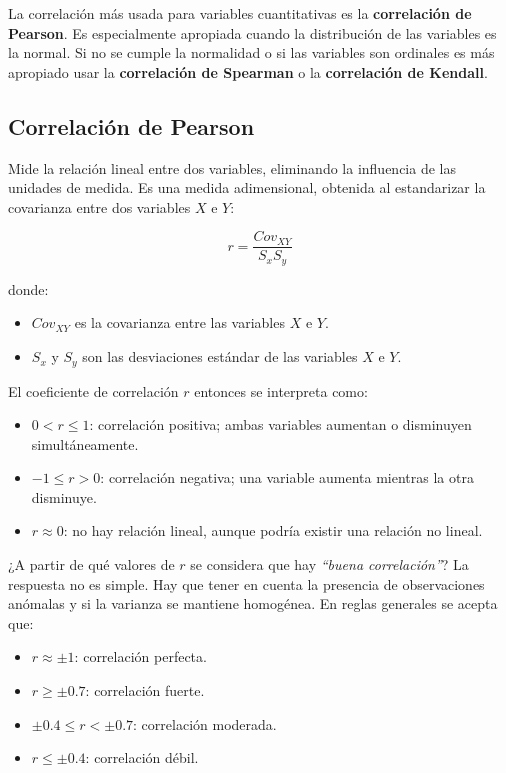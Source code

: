 \documentclass[
  spanish,
  a4paper,
]{scrbook}
\begin{document}
La correlación más usada para variables cuantitativas es la
\textbf{correlación de Pearson}. Es especialmente apropiada cuando la
distribución de las variables es la normal. Si no se cumple la
normalidad o si las variables son ordinales es más apropiado usar la
\textbf{correlación de Spearman} o la \textbf{correlación de Kendall}.

\subsection{Correlación de Pearson}\label{correlaciuxf3n-de-pearson}

Mide la relación lineal entre dos variables, eliminando la influencia de
las unidades de medida. Es una medida adimensional, obtenida al
estandarizar la covarianza entre dos variables \(X\) e \(Y\):

\[
r = \frac{Cov_{XY}}{S_xS_y} 
\]

donde:

\begin{itemize}
\item
  \(Cov_{XY}\) es la covarianza entre las variables \(X\) e \(Y\).
\item
  \(S_x\) y \(S_y\) son las desviaciones estándar de las variables \(X\)
  e \(Y\).
\end{itemize}

El coeficiente de correlación \(r\) entonces se interpreta como:

\begin{itemize}
\item
  \(0 < r \leq 1\): correlación positiva; ambas variables aumentan o
  disminuyen simultáneamente.
\item
  \(-1 \leq r > 0\): correlación negativa; una variable aumenta mientras
  la otra disminuye.
\item
  \(r ≈ 0\): no hay relación lineal, aunque podría existir una relación
  no lineal.
\end{itemize}

¿A partir de qué valores de \(r\) se considera que hay \emph{``buena
correlación''}? La respuesta no es simple. Hay que tener en cuenta la
presencia de observaciones anómalas y si la varianza se mantiene
homogénea. En reglas generales se acepta que:

\begin{itemize}
\item
  \(r ≈ ±1\): correlación perfecta.
\item
  \(r \geq ±0.7\): correlación fuerte.
\item
  \(±0.4 \leq r < ±0.7\): correlación moderada.
\item
  \(r \leq ±0.4\): correlación débil.
\end{itemize}
\end{document}
